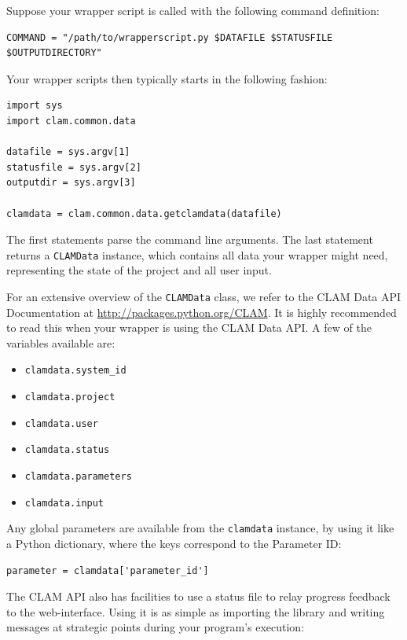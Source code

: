 \documentclass[a4paper,12pt,twoside,openright]{report}
\begin{document}
Suppose your wrapper script is called with the following command definition:

{\footnotesize
\begin{verbatim}
COMMAND = "/path/to/wrapperscript.py $DATAFILE $STATUSFILE $OUTPUTDIRECTORY" 
\end{verbatim}}


Your wrapper scripts then typically starts in the following fashion:


{ \small
\begin{verbatim}
import sys
import clam.common.data

datafile = sys.argv[1]
statusfile = sys.argv[2]
outputdir = sys.argv[3]

clamdata = clam.common.data.getclamdata(datafile)
\end{verbatim}
}

The first statements parse the command line arguments. The last statement
returns a \texttt{CLAMData} instance, which contains all data your wrapper might need,
representing the state of the project and all user input.

For an extensive overview of the \texttt{CLAMData} class, we refer to the CLAM
Data API Documentation at \url{http://packages.python.org/CLAM}. It is highly
recommended to read this when your wrapper is using the CLAM Data API. A few of the
variables available are:

\begin{itemize}
\item \texttt{clamdata.system\_id}
\item \texttt{clamdata.project}
\item \texttt{clamdata.user}
\item \texttt{clamdata.status}
\item \texttt{clamdata.parameters}
\item \texttt{clamdata.input}
\end{itemize}


Any global parameters are available from the \texttt{clamdata} instance, by
using it like a Python dictionary, where the keys correspond to the Parameter ID:

{ \small
\begin{verbatim}
parameter = clamdata['parameter_id']
\end{verbatim}
}

The CLAM API also has facilities to use a status file to relay progress
feedback to the web-interface. Using it is as simple as importing the library
and writing messages at strategic points during your program's execution:
\end{document}
